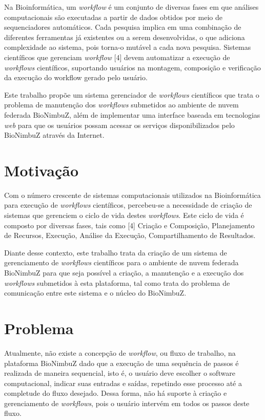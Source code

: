 Na Bioinformática, um \textit{workflow} é um conjunto de diversas fases em que análises computacionais são executadas a partir de dados obtidos por meio de sequenciadores automáticos. Cada pesquisa implica em uma combinação de diferentes ferramentas já existentes ou a serem desenvolvidas, o que adiciona complexidade ao sistema, pois torna-o mutável a cada nova pesquisa. Sistemas científicos que gerenciam \textit{workflow} [4] devem automatizar a execução de \textit{workflows} científicos, suportando usuários na montagem, composição e verificação da execução do workflow gerado pelo usuário.

Este trabalho propõe um sistema gerenciador de \textit{workflows} científicos que trata o problema de manutenção dos \textit{workflows} submetidos ao ambiente de nuvem federada BioNimbuZ, além de implementar uma interface baseada em tecnologias \textit{web} para que os usuários possam acessar os serviços disponibilizados pelo BioNimbuZ através da Internet.

\section{Motivação} \label{cap1sec1}

Com o número crescente de sistemas computacionais utilizados na Bioinformática para execução de \textit{workflows} científicos, percebeu-se a necessidade de criação de sistemas que gerenciem o ciclo de vida destes \textit{workflows}. Este ciclo de vida é composto por diversas fases, tais como [4] Criação e Composição, Planejamento de Recursos, Execução, Análise da Execução, Compartilhamento de Resultados. 

Diante desse contexto, este trabalho trata da criação de um sistema de gerenciamento de \textit{workflows} científicos para o ambiente de nuvem federada BioNimbuZ para que seja possível a criação, a manutenção e a execução dos \textit{workflows} submetidos à esta plataforma, tal como trata do problema de comunicação entre este sistema e o núcleo do BioNimbuZ.

\section{Problema} \label{cap1sec2}

Atualmente, 
não existe a concepção de \textit {workflow}, ou fluxo de trabalho, na plataforma BioNimbuZ dado que a execução de uma sequência de passos é realizada de maneira sequencial, isto é, o usuário deve escolher o software computacional, indicar suas entradas e saídas, repetindo esse processo até a completude do fluxo desejado. Dessa forma, não há suporte à criação e gerenciamento de \textit{workflows}, pois o usuário intervém em todos os passos deste fluxo. 
	
